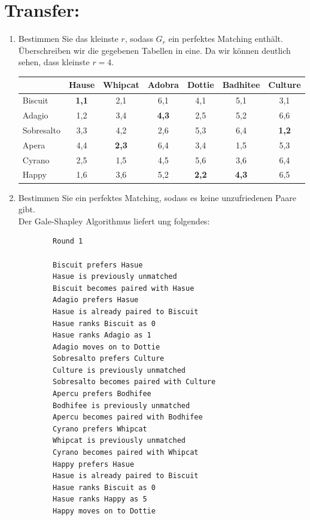     \section*{Transfer:}
    \begin{enumerate}[label=(\alph*)]
    	\item Bestimmen Sie das kleinste $r$, sodass $G_r$ ein perfektes Matching enthält.\\
        Überschreiben wir die gegebenen Tabellen in eine. Da wir können deutlich sehen, dass kleinste $r=4$. %
        \begin{table}[h]\centering
            \begin{tabular}{|l|c|c|c|c|c|c|}
            \hline
            ~          & Hause     & Whipcat   & Adobra    & Dottie    & Badhitee  & Culture   \\ \hline
            Biscuit    & {\bf 1,1} & 2,1       & 6,1       & 4,1       & 5,1       & 3,1       \\ \hline
            Adagio     & 1,2       & 3,4       & {\bf 4,3} & 2,5       & 5,2       & 6,6       \\ \hline
            Sobresalto & 3,3       & 4,2       & 2,6       & 5,3       & 6,4       & {\bf 1,2} \\ \hline
            Apera      & 4,4       & {\bf 2,3} & 6,4       & 3,4       & 1,5       & 5,3       \\ \hline
            Cyrano     & 2,5       & 1,5       & 4,5       & 5,6       & 3,6       & 6,4       \\ \hline
            Happy      & 1,6       & 3,6       & 5,2       & {\bf 2,2} & {\bf 4,3} & 6,5       \\ \hline
            \end{tabular}
        \end{table}
        \item Bestimmen Sie ein perfektes Matching, sodass es keine unzufriedenen Paare gibt.\\
        Der Gale-Shapley Algorithmus liefert ung folgendes: \par
   \begin{lstlisting}
        Round 1
        
        Biscuit prefers Hasue
        Hasue is previously unmatched
        Biscuit becomes paired with Hasue
        Adagio prefers Hasue
        Hasue is already paired to Biscuit
        Hasue ranks Biscuit as 0
        Hasue ranks Adagio as 1
        Adagio moves on to Dottie
        Sobresalto prefers Culture
        Culture is previously unmatched
        Sobresalto becomes paired with Culture
        Apercu prefers Bodhifee
        Bodhifee is previously unmatched
        Apercu becomes paired with Bodhifee
        Cyrano prefers Whipcat
        Whipcat is previously unmatched
        Cyrano becomes paired with Whipcat
        Happy prefers Hasue
        Hasue is already paired to Biscuit
        Hasue ranks Biscuit as 0
        Hasue ranks Happy as 5
        Happy moves on to Dottie
        

\end{lstlisting}
\end{enumerate}
